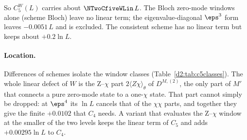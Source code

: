 So $C_5^W(L)$ carries about $\NTwoCfiveWLin\,L$. The Bloch zero-mode windows alone (scheme Bloch) leave no linear term; the
eigenvalue-diagonal $\eps^3$ form leaves $-0.0051\,L$ and is excluded. The consistent scheme has no linear term but keeps
about $+0.2\ln L$.

\paragraph{Location.} Differences of schemes isolate the window classes (Table~\ref{d2:tab:c5classes}). The whole linear
defect of $W$ is the Z--$\chi$ part $2\langle Z\chi\rangle_\theta$ of $D^{M,(2)}$, the only part of $M'$ that connects a pure
zero-mode state to a one-$\chi$ state. That part cannot simply be dropped: at $\eps^4$ its $\ln L$ cancels that of the
$\chi\chi$ parts, and together they give the finite $+0.0102$ that $C_4$ needs. A variant that evaluates the Z--$\chi$ window
at the smaller of the two levels keeps the linear term of $C_5$ and adds $+0.00295\ln L$ to $C_4$.

